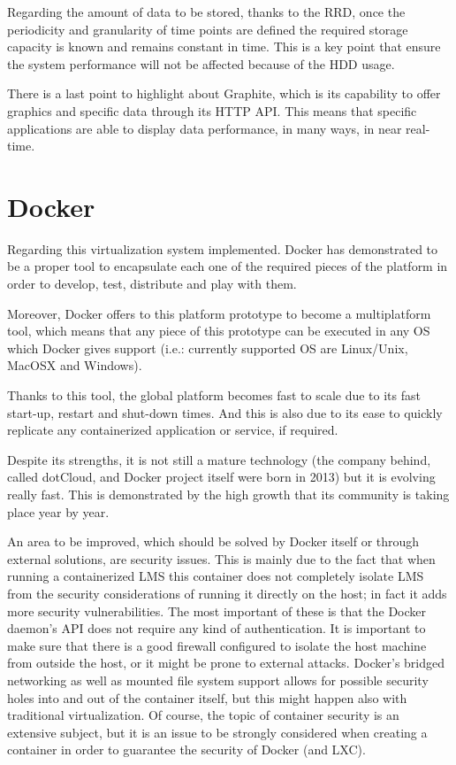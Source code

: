 Regarding the amount of data to be stored, thanks to the RRD, once the periodicity and granularity of time points are defined the required storage capacity is known and remains constant in time. This is a key point that ensure the system performance will not be affected because of the HDD usage.

There is a last point to highlight about Graphite, which is its capability to offer graphics and specific data through its HTTP API. This means that specific applications are able to display data performance, in many ways, in near real-time.

\section{Docker}

Regarding this virtualization system implemented. Docker has demonstrated to be a proper tool to encapsulate each one of the required pieces of the platform in order to develop, test, distribute and play with them.

Moreover, Docker offers to this platform prototype to become a multiplatform tool, which means that any piece of this prototype can be executed in any OS which Docker gives support (i.e.: currently supported OS are Linux/Unix, MacOSX and Windows).

Thanks to this tool, the global platform becomes fast to scale due to its fast start-up, restart and shut-down times. And this is also due to its ease to quickly replicate any containerized application or service, if required. 

Despite its strengths, it is not still a mature technology (the company behind, called dotCloud, and Docker project itself were born in 2013) but it is evolving really fast. This is demonstrated by the high growth that its community is taking place year by year. 

An area to be improved, which should be solved by Docker itself or through external solutions, are security issues. This is mainly due to the fact that when running a containerized LMS this container does not completely isolate LMS from the security considerations of running it directly on the host; in fact it adds more security vulnerabilities. The most important of these is that the Docker daemon's API does not require any kind of authentication. It is important to make sure that there is a good firewall configured to isolate the host machine from outside the host, or it might be prone to external attacks. Docker's bridged networking as well as mounted file system support allows for possible security holes into and out of the container itself, but this might happen also with traditional virtualization. Of course, the topic of container security is an extensive subject, but it is an issue to be strongly considered when creating a container in order to guarantee the security of Docker (and LXC).

